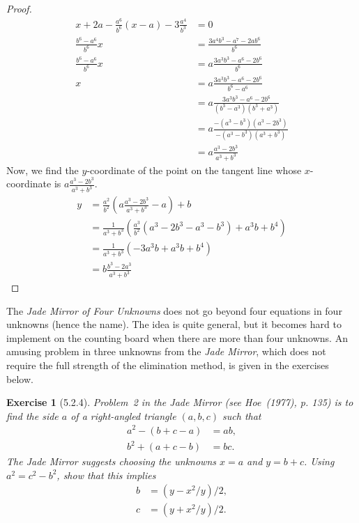 \documentclass[12pt]{article}
\theoremstyle{plain}
\newtheorem{ex}{Exercise}
\begin{document}
\begin{proof}
  \begin{align*}
    x+2a-\frac{a^6}{b^6}(x-a)-3\frac{a^4}{b^3}                                      &= 0 \\
    \frac{b^6-a^6}{b^6}x                                                            &= \frac{3a^4b^3-a^7-2ab^6}{b^6} \\
    \frac{b^6-a^6}{b^6}x                                                            &= a\frac{3a^3b^3-a^6-2b^6}{b^6} \\
    x                                                                               &= a\frac{3a^3b^3-a^6-2b^6}{b^6-a^6} \\
                                                                                    &= a\frac{3a^3b^3-a^6-2b^6}{(b^3-a^3)(b^3+a^3)} \\
                                                                                    &= a\frac{-(a^3-b^3)(a^3-2b^3)}{-(a^3-b^3)(a^3+b^3)} \\
                                                                                    &= a\frac{a^3-2b^3}{a^3+b^3}
  \end{align*}
  Now, we find the $y$-coordinate of the point on the tangent line whose $x$-coordinate is $a\frac{a^3-2b^3}{a^3+b^3}$.
  \begin{align*}
    y &= \frac{a^2}{b^2}\left(a\frac{a^3-2b^3}{a^3+b^3}-a\right)+b \\
      &= \frac{1}{a^3+b^3}\left(\frac{a^3}{b^2}(a^3-2b^3-a^3-b^3)+a^3b+b^4\right) \\
      &= \frac{1}{a^3+b^3}(-3a^3b+a^3b+b^4) \\
      &= b\frac{b^3-2a^3}{a^3+b^3}
  \end{align*}
\end{proof}

The \emph{Jade Mirror of Four Unknowns} does not go beyond four equations in four unknowns (hence the name). The idea is quite general, but it becomes hard to implement on the counting board when there are more than four unknowns. An amusing problem in three unknowns from the \emph{Jade Mirror}, which does not require the full strength of the elimination method, is given in the exercises below.

\begin{ex} [5.2.4]
  Problem~2 in the Jade Mirror (see Hoe~(1977), p. 135) is to find the side $a$ of a right-angled triangle $(a,b,c)$ such that
  \begin{align*}
    a^2-(b+c-a) &= ab, \\
    b^2+(a+c-b) &= bc.
  \end{align*}
  The \emph{Jade Mirror} suggests choosing the unknowns $x=a$ and $y=b+c$. Using $a^2=c^2-b^2$, show that this implies
  \begin{align*}
    b &= (y-x^2/y)/2, \\
    c &= (y+x^2/y)/2.
  \end{align*}
\end{ex}
\end{document}
